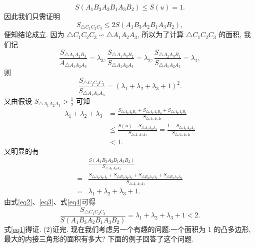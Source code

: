 $$
S\left(A_1 B_3 A_2 B_1 A_3 B_2\right) \leqslant S(u)=1 .
$$
因此我们只需证明
$$
S_{\triangle C_1 C_2 C_3} \leqslant 2 S\left(A_1 B_3 A_2 B_1 A_3 B_2\right), \label{eq1}
$$
便知结论成立.
因为 $\triangle C_1 C_2 C_3 \backsim \triangle A_1 A_2 A_3$, 所以为了计算 $\triangle C_1 C_2 C_3$ 的面积, 我们记
$$
\frac{S_{\triangle A_1 A_2 B_3}}{A_{\triangle A_1 A_2 A_3}}=\lambda_3, \frac{S_{\triangle A_1 A_3 B_2}}{S_{\triangle A_1 A_2 A_3}}=\lambda_2, \frac{S_{\triangle A_2 A_3 B_1}}{S_{\triangle A_1 A_2 A_3}}=\lambda_1,
$$
则
$$
\frac{S_{\triangle C_1 C_2 C_3}}{S_{\triangle A_1 A_2 A_3}}=\left(\lambda_1+\lambda_2+\lambda_3+1\right)^2 . \label{eq2}
$$
又由假设 $S_{\triangle A_1 A_2 A_3}>\frac{1}{2}$ 可知
$$
\begin{aligned}
\lambda_1+\lambda_2+\lambda_3 & =\frac{S_{\triangle A_1 A_2 B_3}+S_{\triangle A_1 A_3 B_2}+S_{\triangle A_2 A_3 B_1}}{S_{\triangle A_1 A_2 A_3}} \\
& \leqslant \frac{S(u)-S_{\triangle A_1 A_2 A_3}}{S_{\triangle A_1 A_2 A_3}}=\frac{1-S_{\triangle A_1 A_2 A_3}}{S_{\triangle A_1 A_2 A_3}} \\
& <1 . \label{eq3}
\end{aligned}
$$
又明显的有
$$
\begin{aligned}
& \frac{S\left(A_1 B_3 A_2 B_1 A_3 B_2\right)}{S_{\triangle A_1 A_2 A_3}} \\
= & \frac{S_{\triangle A_1 A_2 A_3}+S_{\triangle B_1 A_2 A_3}+S_{\triangle B_2 A_1 A_3}+S_{\triangle B_3 A_1 A_2}}{S_{\triangle A_1 A_2 A_3}} \\
= & \lambda_1+\lambda_2+\lambda_3+1 . \label{eq4}
\end{aligned}
$$
由式\ref{eq2}、\ref{eq3}、式\ref{eq4}可得
$$
\frac{S_{\triangle C_1 C_2 C_3}}{S\left(A_1 B_3 A_2 B_1 A_3 B_2\right)}=\lambda_1+\lambda_2+\lambda_3+1<2 .
$$
式\ref{eq1}得证.
(2)证完.
现在我们考虑另一个有趣的问题:一个面积为 1 的凸多边形, 最大的内接三角形的面积有多大? 下面的例子回答了这个问题.




